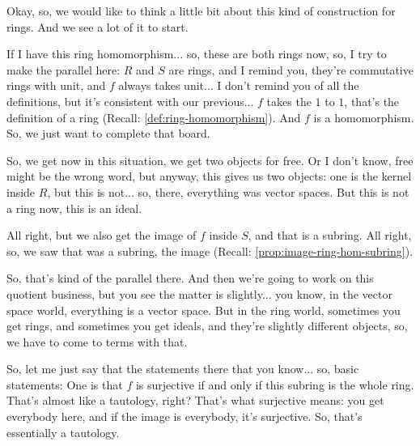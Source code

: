 \begin{speech}[00:21:10 - 00:23:08]
Okay, so, we would like to think a little bit about this kind of construction for rings. And we see a lot of it to start. 

If I have this ring homomorphism... so, these are both rings now, so, I try to make the parallel here: $R$ and $S$ are rings,  and I remind you, they're commutative rings with unit, and $f$ always takes unit... I don't remind you of all the definitions, but it's consistent with our previous... $f$ takes the $1$ to $1$, that's the definition of a ring (Recall: \cref{def:ring-homomorphism}). And $f$ is a homomorphism.  So, we just want to complete that board.

So, we get now in this situation, we get two objects for free. Or I don't know, free might be the wrong word, but anyway, this gives us two objects: one is the kernel inside $R$,  but this is not... so, there, everything was vector spaces. But this is not a ring now, this is an ideal.  

All right, but we also get the image of $f$ inside $S$,  and that is a subring.  All right, so, we saw that was a subring, the image (Recall: \cref{prop:image-ring-hom-subring}). 

So, that's kind of the parallel there. And then we're going to work on this quotient business, but you see the matter is slightly... you know, in the vector space world, everything is a vector space. But in the ring world, sometimes you get rings, and sometimes you get ideals, and they're slightly different objects, so, we have to come to terms with that.

So, let me just say that the statements there that you know... so, basic statements:  One is that $f$ is surjective if and only if this subring is the whole ring.  That's almost like a tautology, right? That's what surjective means: you get everybody here, and if the image is everybody, it's surjective. So, that's essentially a tautology.
\end{speech}

